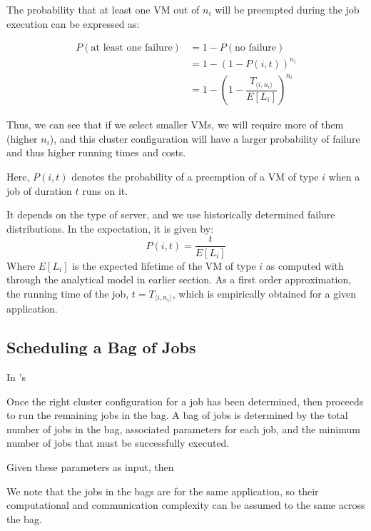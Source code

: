 The probability that at least one VM out of $n_i$ will be preempted during the job execution can be expressed as:

\begin{align}
  \label{eq:pfail1}
  P(\text{at least one failure}) &= 1-P(\text{no failure}) \\
                                 &= 1-(1-P(i, t))^{n_i} \\
                                 &= 1-\left(1-\dfrac{T_{\langle i,n_i \rangle}}{E[L_i]}\right)^{n_i}      
\end{align}

Thus, we can see that if we select smaller VMs, we will require more of them (higher $n_i$), and this cluster configuration will have a larger probability of failure and thus higher running times and costs. 

Here, $P(i, t)$ denotes the probability of a preemption of a VM of type $i$ when a job of duration $t$ runs on it. 

It depends on the type of server, and we use historically determined failure distributions.
In the expectation, it is given by:
\begin{equation}
  \label{eq:pi}
  P(i, t) = \dfrac{t}{E[L_i]}
\end{equation}
Where $E[L_i]$ is the expected lifetime of the VM of type $i$ as computed with through the analytical model in earlier section.
As a first order approximation, the running time of the job, $t=T_{\langle i,n_i \rangle}$, which is empirically obtained for a given application. 




\subsection{Scheduling a Bag of Jobs}

In \sysname's 

Once the right cluster configuration for a job has been determined, \sysname then proceeds to run the remaining jobs in the bag.
A bag of jobs is determined by the total number of jobs in the bag, associated parameters for each job, and the minimum number of jobs that must be successfully executed.  

Given these parameters as input, \sysname then 

We note that the jobs in the bags are for the same application, so their computational and communication complexity can be assumed to the same across the bag. 


